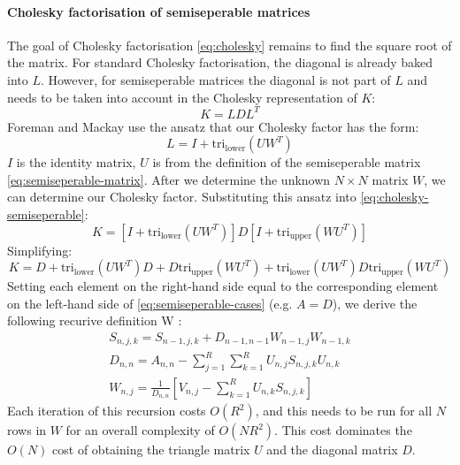 \paragraph{Cholesky factorisation of semiseperable matrices}
The goal of Cholesky factorisation \ref{eq:cholesky} remains to find the square root of the matrix. For standard Cholesky factorisation, the diagonal is already baked into $L$. However, for semiseperable matrices the diagonal is not part of $L$ and needs to be taken into account in the Cholesky representation of $K$:
\begin{equation} \label{eq:cholesky-semiseperable}
    K = L D L^T
\end{equation}
Foreman and Mackay \cite{foreman-mackay} use the ansatz that our Cholesky factor has the form:
\begin{equation*}
    L = I + \text{tri}_{\text{lower}}(U W^T)
\end{equation*}
$I$ is the identity matrix, $U$ is from the definition of the semiseperable matrix \ref{eq:semiseperable-matrix}. After we determine the unknown $N \times N$ matrix $W$, we can determine our Cholesky factor. Substituting this ansatz into \ref{eq:cholesky-semiseperable}:
\begin{equation*}
    K = [I + \text{tri}_{\text{lower}}(U W^T)] D [I + \text{tri}_{\text{upper}}(W U^T)]
\end{equation*}
Simplifying:
\begin{equation*}
    K = D + \text{tri}_{\text{lower}}(U W^T) D + D \text{tri}_{\text{upper}}(W U^T) + \text{tri}_{\text{lower}}(U W^T) D \text{tri}_{\text{upper}}(W U^T)
\end{equation*}
Setting each element on the right-hand side equal to the corresponding element on the left-hand side of \ref{eq:semiseperable-cases} (e.g. $A = D$), we derive the following recurive definition W \cite{foreman-mackay}:
\begin{equation*}
    \begin{aligned}
        S_{n,j,k} = S_{n-1, j, k} + D_{n-1, n-1} W_{n-1,j} W_{n-1, k} \\
        D_{n,n} = A_{n,n} - \sum_{j=1}^{R} \sum_{k=1}^{R} U_{n,j} S_{n,j,k} U_{n,k} \\
        W_{n,j} = \frac{1}{D_{n,n}} \left[ V_{n,j} - \sum_{k=1}^{R} U_{n,k} S_{n,j,k} \right]
    \end{aligned}
\end{equation*}
Each iteration of this recursion costs $O(R^2)$, and this needs to be run for all $N$ rows in $W$ for an overall complexity of $O(N R^2)$. This cost dominates the $O(N)$ cost of obtaining the triangle matrix $U$ and the diagonal matrix $D$. 


